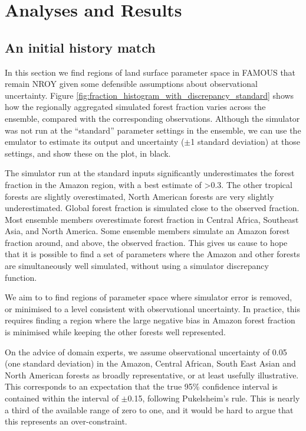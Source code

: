 \documentclass[esd, manuscript]{copernicus}
\begin{document}
\section{Analyses and Results}\label{AnalysesandResults}

\subsection{An initial history match}\label{ssec:initialhistorymatch}
In this section we find regions of land surface parameter space in FAMOUS that remain NROY given some defensible assumptions about observational uncertainty. Figure \ref{fig:fraction_histogram_with_discrepancy_standard} shows how the regionally aggregated simulated forest fraction varies across the ensemble, compared with the corresponding observations. Although the simulator was not run at the ``standard'' parameter settings in the ensemble, we can use the emulator to estimate its output and uncertainty ($\pm$1 standard deviation) at those settings, and show these on the plot, in black.

The simulator run at the standard inputs significantly underestimates the forest fraction in the Amazon region, with a best estimate of >0.3. The other tropical forests are slightly overestimated, North American forests are very slightly underestimated. Global forest fraction is simulated close to the observed fraction. Most ensemble members overestimate forest fraction in Central Africa, Southeast Asia, and North America. Some ensemble members simulate an Amazon forest fraction around, and above, the observed fraction. This gives us cause to hope that it is possible to find a set of parameters where the Amazon and other forests are simultaneously well simulated, without using a simulator discrepancy function. 



We aim to to find regions of parameter space where simulator error is removed, or minimised to a level consistent with observational uncertainty. In practice, this requires finding a region where the large negative bias in Amazon forest fraction is minimised while keeping the other forests well represented.

On the advice of domain experts, we assume observational uncertainty of 0.05 (one standard deviation) in the Amazon, Central African, South East Asian and North American forests as broadly representative, or at least usefully illustrative. This corresponds to an expectation that the true 95\% confidence interval is contained within the interval of $\pm$0.15, following Pukelsheim's rule. This is nearly a third of the available range of zero to one, and it would be hard to argue that this represents an over-constraint.
\end{document}
